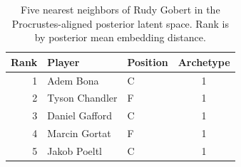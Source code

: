 \begin{table}[htbp]
  \centering\small
  \begin{tabular}{rllc}
    \toprule
    Rank & Player & Position & Archetype \\
    \midrule
    1 & Adem Bona & C & 1 \\
    2 & Tyson Chandler & F & 1 \\
    3 & Daniel Gafford & C & 1 \\
    4 & Marcin Gortat & F & 1 \\
    5 & Jakob Poeltl & C & 1 \\
    \bottomrule
  \end{tabular}
  \caption{Five nearest neighbors of Rudy Gobert in the Procrustes-aligned posterior latent space. Rank is by posterior mean embedding distance.}
  \label{tab:Rudy_Gobert_neighbors}
\end{table}

